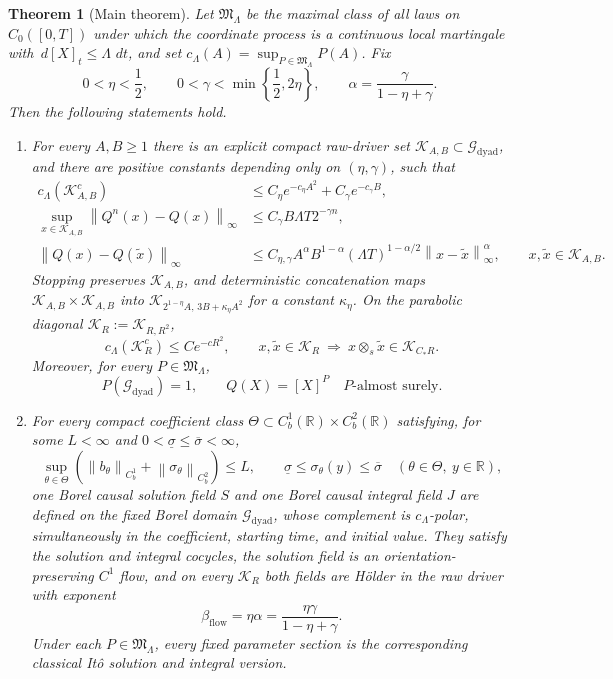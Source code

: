 \documentclass[11pt,reqno]{amsart}
\theoremstyle{plain}
\newtheorem{theorem}{Theorem}[section]
\theoremstyle{definition}
\newcommand{\R}{\mathbb R}
\newcommand{\cG}{\mathcal G}
\newcommand{\cK}{\mathcal K}
\newcommand{\dd}{\,d}
\newcommand{\norm}[1]{\left\lVert #1\right\rVert}
\begin{document}
\begin{theorem}[Main theorem]
\label{thm:main-intro}
Let \(\mathfrak M_\Lambda\) be the maximal class of all laws on
\(C_0([0,T])\) under which the coordinate process is a continuous local
martingale with \(\dd[X]_t\le\Lambda\,\dd t\), and set
\(c_\Lambda(A)=\sup_{P\in\mathfrak M_\Lambda}P(A)\).  Fix
\[
  0<\eta<\frac12,
  \qquad
  0<\gamma<\min\left\{\frac12,2\eta\right\},
  \qquad
  \alpha=\frac{\gamma}{1-\eta+\gamma}.
\]
Then the following statements hold.
\begin{enumerate}[label=(\roman*),leftmargin=2.2em]
  \item For every \(A,B\ge1\) there is an explicit compact raw-driver set
  \(\cK_{A,B}\subset\cG_{\mathrm{dyad}}\), and there are positive constants
  depending only on \((\eta,\gamma)\), such that
  \begin{align*}
    c_\Lambda(\cK_{A,B}^c)
      &\le C_\eta e^{-c_\eta A^2}+C_\gamma e^{-c_\gamma B},\\
    \sup_{x\in\cK_{A,B}}\norm{Q^n(x)-Q(x)}_\infty
      &\le C_\gamma B\Lambda T2^{-\gamma n},\\
    \norm{Q(x)-Q(\widetilde x)}_\infty
      &\le C_{\eta,\gamma}A^\alpha B^{1-\alpha}
       (\Lambda T)^{1-\alpha/2}
       \norm{x-\widetilde x}_\infty^\alpha,
       \qquad x,\widetilde x\in\cK_{A,B}.
  \end{align*}
  Stopping preserves \(\cK_{A,B}\), and deterministic concatenation maps
  \(\cK_{A,B}\times\cK_{A,B}\) into
  \(\cK_{2^{1-\eta}A,\,3B+\kappa_\eta A^2}\) for a constant
  \(\kappa_\eta\).  On the parabolic diagonal
  \(\cK_R:=\cK_{R,R^2}\),
  \[
    c_\Lambda(\cK_R^c)\le Ce^{-cR^2},
    \qquad
    x,\widetilde x\in\cK_R
    \ \Longrightarrow\ 
    x\otimes_s\widetilde x\in\cK_{C_*R}.
  \]
  Moreover, for every \(P\in\mathfrak M_\Lambda\),
  \[
    P(\cG_{\mathrm{dyad}})=1,
    \qquad
    Q(X)=[X]^P\quad P\text{-almost surely}.
  \]

  \item For every compact coefficient class
  \(\Theta\subset C_b^1(\R)\times C_b^2(\R)\) satisfying, for some
  \(L<\infty\) and
  \(0<\underline\sigma\le\overline\sigma<\infty\),
  \[
    \sup_{\theta\in\Theta}
    \left(
      \norm{b_\theta}_{C_b^1}+\norm{\sigma_\theta}_{C_b^2}
    \right)\le L,
    \qquad
    \underline\sigma\le\sigma_\theta(y)\le\overline\sigma
    \quad(\theta\in\Theta,\ y\in\R),
  \]
  one Borel causal solution field \(S\) and one Borel causal integral field
  \(J\) are defined on the
  fixed Borel domain \(\cG_{\mathrm{dyad}}\), whose complement is
  \(c_\Lambda\)-polar, simultaneously in the coefficient, starting time,
  and initial value.  They satisfy the solution and integral cocycles, the
  solution field is an orientation-preserving \(C^1\) flow, and on every
  \(\cK_R\) both fields are H\"older in the raw driver with exponent
  \[
    \beta_{\mathrm{flow}}
    =\eta\alpha
    =\frac{\eta\gamma}{1-\eta+\gamma}.
  \]
  Under each \(P\in\mathfrak M_\Lambda\), every fixed parameter section is
  the corresponding classical It\^o solution and integral version.
\end{enumerate}
\end{theorem}
\end{document}
